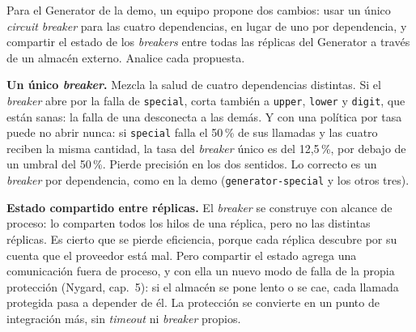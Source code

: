 \documentclass[variant=guia,cover=institutional,mode=screen]{ua-engineering-v6-article}
\begin{document}
\begin{uaexercise}
Para el Generator de la demo, un equipo propone dos cambios: usar un único \emph{circuit breaker} para las cuatro dependencias, en lugar de uno por dependencia, y compartir el estado de los \emph{breakers} entre todas las réplicas del Generator a través de un almacén externo. Analice cada propuesta.
\end{uaexercise}
\begin{uaanswer}
\textbf{Un único \emph{breaker}.} Mezcla la salud de cuatro dependencias distintas. Si el \emph{breaker} abre por la falla de \texttt{special}, corta también a \texttt{upper}, \texttt{lower} y \texttt{digit}, que están sanas: la falla de una desconecta a las demás. Y con una política por tasa puede no abrir nunca: si \texttt{special} falla el 50\,\% de sus llamadas y las cuatro reciben la misma cantidad, la tasa del \emph{breaker} único es del 12,5\,\%, por debajo de un umbral del 50\,\%. Pierde precisión en los dos sentidos. Lo correcto es un \emph{breaker} por dependencia, como en la demo (\texttt{generator-special} y los otros tres).

\textbf{Estado compartido entre réplicas.} El \emph{breaker} se construye con alcance de proceso: lo comparten todos los hilos de una réplica, pero no las distintas réplicas. Es cierto que se pierde eficiencia, porque cada réplica descubre por su cuenta que el proveedor está mal. Pero compartir el estado agrega una comunicación fuera de proceso, y con ella un nuevo modo de falla de la propia protección (Nygard, cap.~5): si el almacén se pone lento o se cae, cada llamada protegida pasa a depender de él. La protección se convierte en un punto de integración más, sin \emph{timeout} ni \emph{breaker} propios.
\end{uaanswer}
\end{document}
